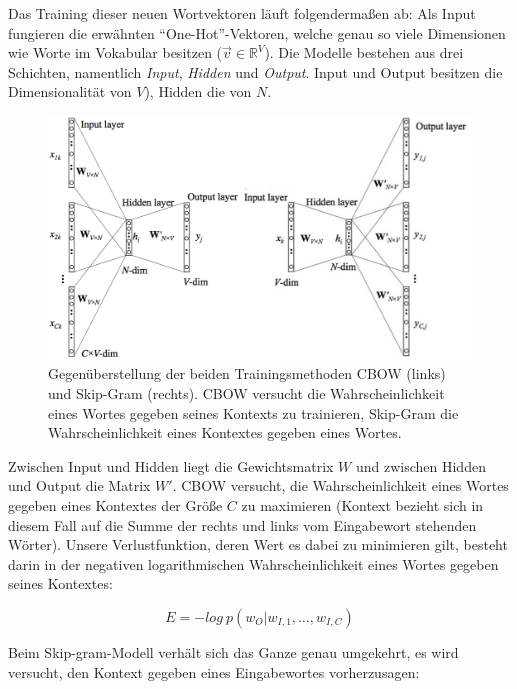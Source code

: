 Das Training dieser neuen Wortvektoren läuft folgendermaßen ab:
Als Input fungieren die erwähnten ``One-Hot''-Vektoren, welche genau so viele Dimensionen wie Worte im Vokabular besitzen
($\vec{v} \in \mathbb{R}^V$).
Die Modelle bestehen aus drei Schichten, namentlich \emph{Input}, \emph{Hidden} und \emph{Output}.
Input und Output besitzen die Dimensionalität von $V$), Hidden die von $N$.\\

\begin{figure}[h]
  \centering
  \includegraphics[width=1.1\textwidth]{../img/cbowskip.png}
  \caption[Gegenüberstellung von Skip-Gram und CBOW]{Gegenüberstellung der beiden Trainingsmethoden CBOW (links)
  und Skip-Gram (rechts). CBOW versucht die Wahrscheinlichkeit eines Wortes gegeben seines Kontexts zu trainieren,
  Skip-Gram die Wahrscheinlichkeit eines Kontextes gegeben eines Wortes.}
\end{figure}

Zwischen Input und Hidden liegt die Gewichtsmatrix $W$ und zwischen Hidden und Output die Matrix $W'$.
CBOW versucht, die Wahrscheinlichkeit eines Wortes gegeben eines Kontextes
der Größe $C$ zu maximieren (Kontext bezieht sich in diesem Fall auf die Summe der rechts und links vom Eingabewort stehenden
Wörter). Unsere Verlustfunktion, deren Wert es dabei zu minimieren gilt, besteht darin in der negativen logarithmischen
Wahrscheinlichkeit eines Wortes gegeben seines Kontextes:

\begin{equation}
  E = - log\ p(w_O | w_{I,1}, \ldots, w_{I,C})
\end{equation}

Beim Skip-gram-Modell verhält sich das Ganze genau umgekehrt, es wird versucht, den Kontext gegeben eines Eingabewortes
vorherzusagen:

